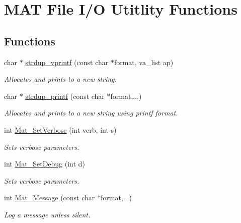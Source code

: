 \hypertarget{group__mat__util}{
\section{MAT File I/O Utitlity Functions}
\label{group__mat__util}
}
\subsection*{Functions}
\begin{DoxyCompactItemize}
\item 
char $\ast$ \hyperlink{group__mat__util_ga2b342987d3b664345cb233640b611fe9}{strdup\_\-vprintf} (const char $\ast$format, va\_\-list ap)
\begin{DoxyCompactList}\small\item\em Allocates and prints to a new string. \item\end{DoxyCompactList}\item 
char $\ast$ \hyperlink{group__mat__util_ga291b08f933c75fb70e3736b669896ebd}{strdup\_\-printf} (const char $\ast$format,...)
\begin{DoxyCompactList}\small\item\em Allocates and prints to a new string using printf format. \item\end{DoxyCompactList}\item 
int \hyperlink{group__mat__util_gaf348b811ee26bfc923924878cea3c9ba}{Mat\_\-SetVerbose} (int verb, int s)
\begin{DoxyCompactList}\small\item\em Sets verbose parameters. \item\end{DoxyCompactList}\item 
int \hyperlink{group__mat__util_gad75e2962dcaf2ac366f2420bb5b13094}{Mat\_\-SetDebug} (int d)
\begin{DoxyCompactList}\small\item\em Sets verbose parameters. \item\end{DoxyCompactList}\item 
int \hyperlink{group__mat__util_gae7dfa394b111bc908a616f8f5bddaa97}{Mat\_\-Message} (const char $\ast$format,...)
\begin{DoxyCompactList}\small\item\em Log a message unless silent. \item\end{DoxyCompactList}\item 

\end{DoxyCompactItemize}
